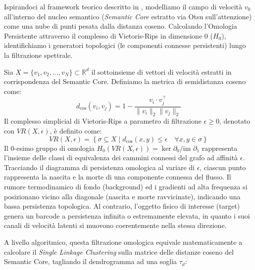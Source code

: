 \documentclass[12pt,a4paper]{report}
\begin{document}
Ispirandoci al framework teorico descritto in \cite{carlsson2009topology, edelsbrunner2010computational}, modelliamo il campo di velocità $v_0$ all'interno del nucleo semantico (\textit{Semantic Core} estratto via Otsu sull'attenzione) come una nube di punti pesata dalla distanza coseno. Calcolando l'Omologia Persistente attraverso il complesso di Vietoris-Rips in dimensione $0$ ($H_0$), identifichiamo i generatori topologici (le componenti connesse persistenti) lungo la filtrazione spettrale.

Sia $X = \{v_1, v_2, \dots, v_N\} \subset \mathbb{R}^d$ il sottoinsieme di vettori di velocità estratti in corrispondenza del Semantic Core. Definiamo la metrica di semidistanza coseno come:
\begin{equation}
    d_{\text{cos}}(v_i, v_j) = 1 - \frac{v_i \cdot v_j^\top}{\|v_i\|_2 \|v_j\|_2}
\end{equation}
Il complesso simplicial di Vietoris-Rips a parametro di filtrazione $\epsilon \ge 0$, denotato con $VR(X, \epsilon)$, è definito come:
\begin{equation}
    VR(X, \epsilon) = \left\{ \sigma \subseteq X \mid d_{\text{cos}}(x, y) \le \epsilon \quad \forall x, y \in \sigma \right\}
\end{equation}
Il 0-esimo gruppo di omologia $H_0(VR(X, \epsilon)) = \ker \partial_0 / \text{im } \partial_1$ rappresenta l'insieme delle classi di equivalenza dei cammini connessi del grafo ad affinità $\epsilon$. Tracciando il diagramma di persistenza omologica al variare di $\epsilon$, ciascun punto rappresenta la nascita e la morte di una componente connessa del flusso. Il rumore termodinamico di fondo (background) ed i gradienti ad alta frequenza si posizionano vicino alla diagonale (nascita e morte ravvicinate), indicando una bassa persistenza topologica. Al contrario, l'oggetto fisico di interesse (target) genera un barcode a persistenza infinita o estremamente elevata, in quanto i suoi canali di velocità latenti si muovono coerentemente nella stessa direzione.

A livello algoritmico, questa filtrazione omologica equivale matematicamente a calcolare il \textit{Single Linkage Clustering} sulla matrice delle distanze coseno del Semantic Core, tagliando il dendrogramma ad una soglia $\tau_d$:
\end{document}

